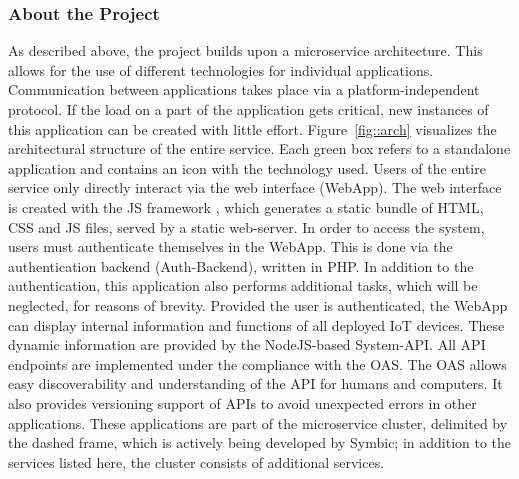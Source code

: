         \subsubsection{About the Project}\label{ssec::project}
        
        \noindent As described above, the project builds upon a microservice architecture. This allows for the use of different technologies for individual applications. Communication between applications takes place via a platform-independent protocol. If the load on a part of the application gets critical, new instances of this application can be created with little effort.\newline
        Figure~\ref{fig::arch} visualizes the architectural structure of the entire service. Each green box refers to a standalone application and contains an icon with the technology used. Users of the entire service only directly interact via the web interface (WebApp). The web interface is created with the \ac{JS} framework , which generates a static bundle of HTML, CSS and \ac{JS} files, served by a static web-server. In order to access the system, users must authenticate themselves in the WebApp. This is done via the authentication backend (Auth-Backend), written in PHP. In addition to the authentication, this application also performs additional tasks, which will be neglected, for reasons of brevity. Provided the user is authenticated, the WebApp can display internal information and functions of all deployed \ac{IoT} devices. These dynamic information are provided by the NodeJS-based System-\ac{API}. All \ac{API} endpoints are implemented under the compliance with the \ac{OAS}. The \ac{OAS} allows easy discoverability and understanding of the \ac{API} for humans and computers. It also provides versioning support of \ac{API}s to avoid unexpected errors in other applications. These applications are part of the microservice cluster, delimited by the dashed frame, which is actively being developed by Symbic; in addition to the services listed here, the cluster consists of additional services.\newline
